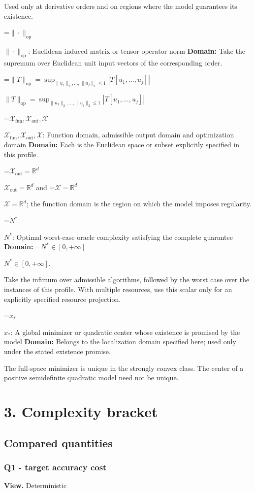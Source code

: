 \documentclass[10pt,a4paper]{article}
\newcommand{\AtlasMath}[1]{\par\begingroup\centering\setbox0=\hbox{$\displaystyle #1$}\ifdim\wd0>1.4\linewidth\typeout{ATLAS WIDE FORMULA: \the\wd0}\fi\ifdim\wd0>\linewidth\resizebox{\linewidth}{!}{\box0}\else\box0\fi\par\endgroup}
\newcommand{\AtlasInlineMath}[1]{\begingroup\setbox0=\hbox{$#1$}\ifdim\wd0>.4\linewidth\endgroup\AtlasMath{#1}\else\endgroup$#1$\fi}
\begin{document}
Used only at derivative orders and on regions where the model guarantees its existence.

\AtlasInlineMath{\|\cdot\|_{\mathrm{op}}}: Euclidean induced matrix or tensor operator norm \textbf{Domain:} Take the supremum over Euclidean unit input vectors of the corresponding order.

\AtlasInlineMath{\|T\|_{\mathrm{op}}=\sup_{\|u_1\|_2,\ldots,\|u_j\|_2\le1}|T[u_1,\ldots,u_j]|}

\AtlasInlineMath{\mathcal{X}_{\mathrm{fun}},\mathcal{X}_{\mathrm{out}},\mathcal{X}}: Function domain, admissible output domain and optimization domain \textbf{Domain:} Each is the Euclidean space or subset explicitly specified in this profile.

\AtlasInlineMath{\mathcal{X}_{\mathrm{out}}=\mathbb{R}^d} and \AtlasInlineMath{\mathcal{X}=\mathbb{R}^d}; the function domain is the region on which the model imposes regularity.

\AtlasInlineMath{N^*}: Optimal worst-case oracle complexity satisfying the complete guarantee \textbf{Domain:} \AtlasInlineMath{N^*\in[0,+\infty]}.

Take the infimum over admissible algorithms, followed by the worst case over the instances of this profile. With multiple resources, use this scalar only for an explicitly specified resource projection.

\AtlasInlineMath{x_*}: A global minimizer or quadratic center whose existence is promised by the model \textbf{Domain:} Belongs to the localization domain specified here; used only under the stated existence promise.

The full-space minimizer is unique in the strongly convex class. The center of a positive semidefinite quadratic model need not be unique.

\section{3. Complexity bracket}
\subsection{Compared quantities}
\subsubsection{Q1 - target accuracy cost}
\textbf{View.} Deterministic
\end{document}
